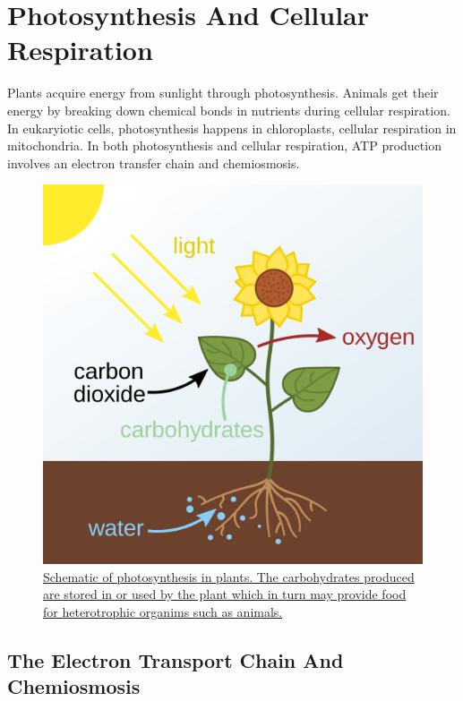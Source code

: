 \hypertarget{photosynthesis-and-cellular-respiration}{%
\chapter{Photosynthesis And Cellular Respiration}\label{photosynthesis-and-cellular-respiration}}

Plants acquire energy from sunlight through photosynthesis. Animals get their energy by breaking down chemical bonds in nutrients during cellular respiration. In eukaryiotic cells, photosynthesis happens in chloroplasts, cellular respiration in mitochondria. In both photosynthesis and cellular respiration, ATP production involves an electron transfer chain and chemiosmosis.



\begin{figure}

{\centering \includegraphics[width=0.7\linewidth]{./figures/photosynthesis/Photosynthesis_en} 

}

\caption{\href{https://commons.wikimedia.org/wiki/File:Photosynthesis_en.svg}{Schematic of photosynthesis in plants. The carbohydrates produced are stored in or used by the plant which in turn may provide food for heterotrophic organims such as animals.}}\label{fig:photosynthesispic}
\end{figure}

\hypertarget{the-electron-transport-chain-and-chemiosmosis}{%
\section{The Electron Transport Chain And Chemiosmosis}\label{the-electron-transport-chain-and-chemiosmosis}}

